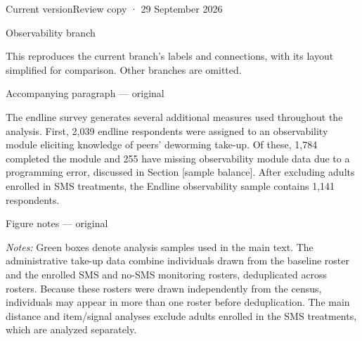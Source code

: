\documentclass[11pt]{article}
\begin{document}
{\LARGE Current version}\hfill{\small Review copy · 29 September 2026}

{\large Observability branch}

{\small This reproduces the current branch's labels and connections, with its layout simplified for comparison. Other branches are omitted.}

\begin{center}
\end{center}

{\large Accompanying paragraph — original}

The endline survey generates several additional measures used throughout the analysis. First, 2,039 endline respondents were assigned to an observability module eliciting knowledge of peers' deworming take-up. Of these, 1,784 completed the module and 255 have missing observability module data due to a programming error, discussed in Section [sample balance]. After excluding adults enrolled in SMS treatments, the Endline observability sample contains 1,141 respondents.

{\large Figure notes — original}

{\small\textit{Notes:} Green boxes denote analysis samples used in the main text. The administrative take-up data combine individuals drawn from the baseline roster and the enrolled SMS and no-SMS monitoring rosters, deduplicated across rosters. Because these rosters were drawn independently from the census, individuals may appear in more than one roster before deduplication. The main distance and item/signal analyses exclude adults enrolled in the SMS treatments, which are analyzed separately.}
\end{document}
